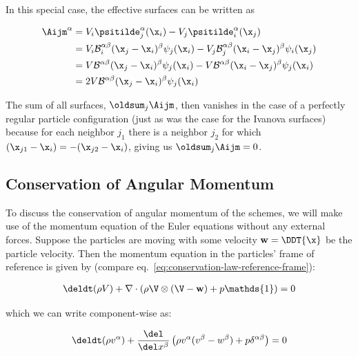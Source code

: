 In this special case, the effective surfaces can be written as

\begin{align}
 \Aijm^\alpha &= V_i \psitilde_j^\alpha(\x_i) - V_j \psitilde_i^\alpha (\x_j) \\
 &= V_i \mathcal{B}_i^{\alpha\beta}(\x_j - \x_i)^\beta \psi_j(\x_i) -
    V_j \mathcal{B}_j^{\alpha\beta}(\x_i - \x_j)^\beta \psi_i(\x_j) \\
 &= V \mathcal{B}^{\alpha\beta}(\x_j - \x_i)^\beta \psi_j(\x_i) -
    V \mathcal{B}^{\alpha\beta}(\x_i - \x_j)^\beta \psi_j(\x_i) \\
 &= 2 V \mathcal{B}^{\alpha\beta}(\x_j - \x_i)^\beta \psi_j(\x_i)
\end{align}

The sum of all surfaces, $\oldsum_j \Aijm$, then vanishes in the case of a perfectly regular
particle configuration (just as was the case for the Ivanova surfaces) because for each neighbor
$j_1$ there is a neighbor $j_2$ for which $(\x_{j1} - \x_i) = -(\x_{j2} - \x_i)$, giving us
$\oldsum_j \Aijm = 0$.












\subsection{Conservation of Angular Momentum}\label{chap:meshless-conservation-angular-momentum}


To discuss the conservation of angular momentum of the schemes, we will make use of the momentum
equation of the Euler equations without any external forces. Suppose the particles are moving with
some velocity $\mathbf{w} = \DDT{\x}$ be the particle velocity. Then the momentum equation in the
particles' frame of reference is given by (compare eq.~\ref{eq:conservation-law-reference-frame}):

\begin{align}
\deldt (\rho V) + \nabla \cdot \left( \rho \V \otimes (\V - \mathbf{w}) + p \mathds{1} \right) = 0
\end{align}

which we can write component-wise as:

\begin{align}
\deldt (\rho v^\alpha) + \frac{\del}{\del x^\beta} \left( \rho v^\alpha (v^\beta - w^\beta) + p
\delta^{\alpha\beta} \right) = 0
\end{align}

